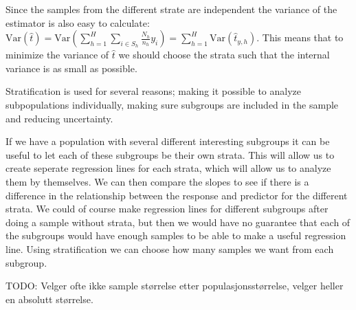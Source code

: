 \documentclass{article}
\begin{document}
Since the samples from the different strate are independent the variance of the estimator is also
easy to calculate: \(\mathrm{Var}(\hat{t}) = \mathrm{Var}\left(\sum_{h =
   1}^H\sum_{i \in S_h}\frac{N_h}{n_h}y_i\right) = \sum_{h =
   1}^H\mathrm{Var}\left(\hat{t}_{y, h}\right)\). This
means that to minimize the variance of \(\hat{t}\) we should choose the strata
such that the internal variance is as small as possible.

Stratification is used for several reasons; making it possible to analyze
subpopulations individually, making sure subgroups are included in the sample
and reducing uncertainty.

If we have a population with several different interesting subgroups it can be
useful to let each of these subgroups be their own strata. This will allow us to
create seperate regression lines for each strata, which will allow us to
analyze them by themselves. We can then compare the slopes to see if there is a difference in the relationship between the
response and predictor for the different strata. We could of course make
regression lines for different subgroups after doing a sample without strata,
but then we would have no guarantee that each of the subgroups would have enough
samples to be able to make a useful regression line. Using stratification we can
choose how many samples we want from each subgroup.

TODO: Velger ofte ikke sample størrelse etter populasjonsstørrelse, velger
heller en absolutt størrelse.
\end{document}
